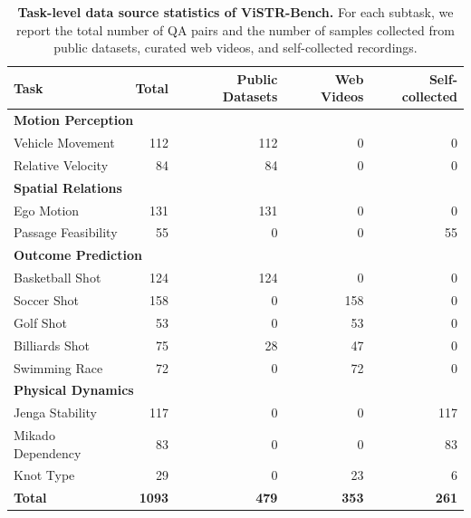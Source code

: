 \begin{table}[!t]
    \centering
    \caption{
        \textbf{Task-level data source statistics of ViSTR-Bench.}
        For each subtask, we report the total number of QA pairs and the number of samples collected from public datasets, curated web videos, and self-collected recordings.
    }
    \label{tab:detailed_data_sources}
    \small
    \begin{tabular}{lrrrr}
        \toprule
        \textbf{Task} & \textbf{Total} & \textbf{Public Datasets} & \textbf{Web Videos} & \textbf{Self-collected} \\
        \midrule

        \multicolumn{5}{l}{\textbf{Motion Perception}} \\
        \quad Vehicle Movement & 112 & 112 & 0 & 0 \\
        \quad Relative Velocity & 84 & 84 & 0 & 0 \\
        \midrule

        \multicolumn{5}{l}{\textbf{Spatial Relations}} \\
        \quad Ego Motion & 131 & 131 & 0 & 0 \\
        \quad Passage Feasibility & 55 & 0 & 0 & 55 \\
        \midrule

        \multicolumn{5}{l}{\textbf{Outcome Prediction}} \\
        \quad Basketball Shot & 124 & 124 & 0 & 0 \\
        \quad Soccer Shot & 158 & 0 & 158 & 0 \\
        \quad Golf Shot & 53 & 0 & 53 & 0 \\
        \quad Billiards Shot & 75 & 28 & 47 & 0 \\
        \quad Swimming Race & 72 & 0 & 72 & 0 \\
        \midrule

        \multicolumn{5}{l}{\textbf{Physical Dynamics}} \\
        \quad Jenga Stability & 117 & 0 & 0 & 117 \\
        \quad Mikado Dependency & 83 & 0 & 0 & 83 \\
        \quad Knot Type & 29 & 0 & 23 & 6 \\
        \midrule
        
        \textbf{Total} & \textbf{1093} & \textbf{479} & \textbf{353} & \textbf{261} \\
        \bottomrule
    \end{tabular}
\end{table}

